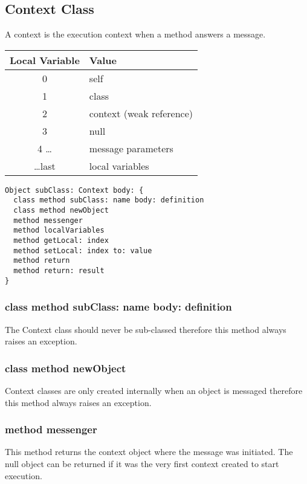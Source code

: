 \subsection {Context Class}

A context is the execution context when a method answers a message.
\begin{center}
  \begin{tabular}{ c | l }
    Local Variable & Value\\ \hline
    0 & self \\
    1 & class \\
    2 & context (weak reference) \\
    3 & null \\
    4 \dots & message parameters \\
    \dots last & local variables \\
  \end{tabular}
\end{center}

\begin{lstlisting}
Object subClass: Context body: {
  class method subClass: name body: definition
  class method newObject
  method messenger
  method localVariables
  method getLocal: index
  method setLocal: index to: value
  method return
  method return: result
}
\end{lstlisting}

\subsubsection {class method subClass: name body: definition}
The Context class should never be sub-classed therefore this method always
raises an exception.

\hfill
\subsubsection {class method newObject}
Context classes are only created internally when an object is messaged
therefore this method always raises an exception.

\hfill
\subsubsection {method messenger}
This method returns the context object where the message was
initiated. The null object can be returned if it was the very first context
created to start execution.
